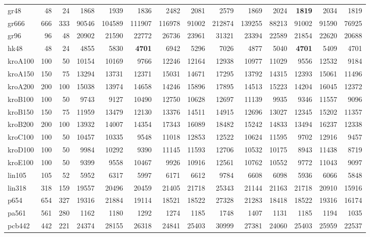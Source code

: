 {\begin{longtable}{l r r r r r r r r r r r r r}
gr48 & 48 & 24 & 1868 & 1939 & 1836 & 2482 & 2081 & 2579 & 1869 & 2024 & \textbf{1819} & 2034 & 1819 \\
gr666 & 666 & 333 & 90546 & 104589 & 111907 & 116978 & 91002 & 212874 & 139255 & 88213 & 91002 & 91590 & 76925 \\
gr96 & 96 & 48 & 20902 & 21590 & 22772 & 26736 & 23961 & 31321 & 23394 & 22589 & 21854 & 22620 & 20688 \\
hk48 & 48 & 24 & 4855 & 5830 & \textbf{4701} & 6942 & 5296 & 7026 & 4877 & 5040 & \textbf{4701} & 5409 & 4701 \\
kroA100 & 100 & 50 & 10154 & 10169 & 9766 & 12246 & 12164 & 12938 & 10977 & 11029 & 9556 & 12532 & 9184 \\
kroA150 & 150 & 75 & 13294 & 13731 & 12371 & 15031 & 14671 & 17295 & 13792 & 14315 & 12393 & 15061 & 11496 \\
kroA200 & 200 & 100 & 15038 & 13974 & 14658 & 14246 & 15896 & 17895 & 14513 & 15223 & 14204 & 16045 & 12372 \\
kroB100 & 100 & 50 & 9743 & 9127 & 10490 & 12750 & 10628 & 12697 & 11139 & 9935 & 9346 & 11557 & 9096 \\
kroB150 & 150 & 75 & 11959 & 13479 & 12130 & 13376 & 14511 & 14915 & 12696 & 13027 & 12345 & 15202 & 11357 \\
kroB200 & 200 & 100 & 13932 & 14007 & 14354 & 17343 & 16089 & 18482 & 15242 & 14833 & 13494 & 16237 & 12338 \\
kroC100 & 100 & 50 & 10457 & 10335 & 9548 & 11018 & 12853 & 12522 & 10624 & 11595 & 9702 & 12916 & 9457 \\
kroD100 & 100 & 50 & 9984 & 10292 & 9390 & 11145 & 11593 & 12706 & 10532 & 10175 & 8943 & 11438 & 8719 \\
kroE100 & 100 & 50 & 9399 & 9558 & 10467 & 9926 & 10916 & 12561 & 10762 & 10552 & 9772 & 11043 & 9097 \\
lin105 & 105 & 52 & 5952 & 6317 & 5997 & 6171 & 6612 & 9784 & 6608 & 6098 & 5936 & 6066 & 5848 \\
lin318 & 318 & 159 & 19557 & 20496 & 20459 & 21405 & 21718 & 25343 & 21144 & 21163 & 21718 & 20910 & 15916 \\
p654 & 654 & 327 & 19316 & 21884 & 19114 & 18521 & 18522 & 27328 & 21283 & 18418 & 18522 & 19316 & 16174 \\
pa561 & 561 & 280 & 1162 & 1180 & 1292 & 1274 & 1185 & 1748 & 1407 & 1131 & 1185 & 1194 & 1035 \\
pcb442 & 442 & 221 & 24374 & 28155 & 26318 & 24841 & 25403 & 30999 & 27381 & 24060 & 25403 & 25959 & 22537 \\

\end{longtable}}
